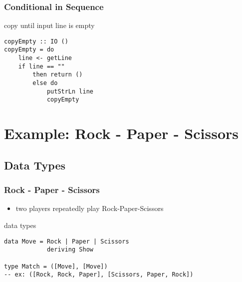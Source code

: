 \documentclass[dvipsnames]{beamer}
\theoremstyle{plain}
\begin{document}
\begin{frame}[fragile]
  \frametitle{Conditional in Sequence}

  \begin{exampleblock}{copy until input line is empty}
    \begin{lstlisting}
copyEmpty :: IO ()
copyEmpty = do
    line <- getLine
    if line == ""
        then return ()
        else do
            putStrLn line
            copyEmpty
    \end{lstlisting}
  \end{exampleblock}
\end{frame}

\section{Example: Rock - Paper - Scissors}

\subsection{Data Types}

\begin{frame}[fragile]
  \frametitle{Rock - Paper - Scissors}

  \begin{itemize}
    \item two players repeatedly play Rock-Paper-Scissors
  \end{itemize}

  \begin{exampleblock}{data types}
    \begin{lstlisting}
data Move = Rock | Paper | Scissors
            deriving Show

type Match = ([Move], [Move])
-- ex: ([Rock, Rock, Paper], [Scissors, Paper, Rock])
    \end{lstlisting}
  \end{exampleblock}
\end{frame}
\end{document}
